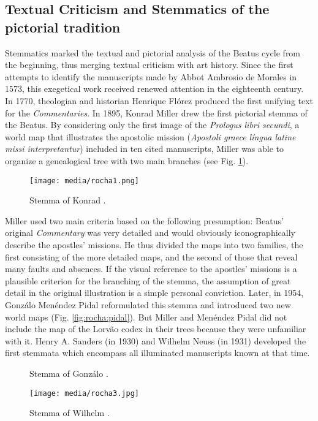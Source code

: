 \begin{paper}
\section*{Textual Criticism and Stemmatics of the pictorial tradition}

Stemmatics marked the textual and pictorial analysis of the Beatus cycle
from the beginning, thus merging textual criticism with art history.
Since the first attempts to identify the manuscripts made by Abbot
Ambrosio de Morales in 1573, this exegetical work received renewed
attention in the eighteenth century. In 1770, theologian and historian
Henrique Flórez produced the first unifying text for the
\emph{Commentaries}. In 1895, Konrad Miller drew the first pictorial stemma of the Beatus. By considering only the first image of the
\emph{Prologus libri secundi}, a world map that illustrates the
apostolic mission (\emph{Apostoli graece língua latine missi
interpretantur}) included in ten cited manuscripts, Miller was able to
organize a genealogical tree with two main branches (see Fig.  \ref{fig:rocha:miller1895}).

\begin{figure}[H]
\centering
\texttt{[image: media/rocha1.png]}
\caption{Stemma of Konrad \citet{miller_mappaemundi_1895}.}
\label{fig:rocha:miller1895}
\end{figure}

Miller used two main criteria based on the following presumption:
Beatus' original \emph{Commentary} was very detailed and would obviously
iconographically describe the apostles' missions. He thus divided the
maps into two families, the first consisting of the more detailed maps,
and the second of those that reveal many faults and absences. If the
visual reference to the apostles' missions is a plausible criterion for
the branching of the stemma, the assumption of great detail in
the original illustration is a simple personal conviction. Later, in
1954, Gonzálo Menéndez Pidal reformulated this stemma and
introduced two new world maps (Fig. \ref{fig:rocha:pidal}). But Miller and Menéndez Pidal
did not include the map of the Lorvão codex in their trees because they
were unfamiliar with it. Henry A. Sanders (in 1930) and Wilhelm Neuss
(in 1931) developed the first stemmata which encompass all
illuminated manuscripts known at that time.


\begin{figure}[H]
    \centering
    \begin{minipage}[b]{0.45\textwidth}
        \caption{Stemma of Gonzálo \citet{menendez_mozarabes_1954}.}
        \label{fig:rocha:pidal}
    \end{minipage}
    \hfill
    \begin{minipage}[b]{0.45\textwidth}
        \texttt{[image: media/rocha3.jpg]}
        \caption{Stemma of Wilhelm \citet{neuss_apokalypse_1931}.}
        \label{fig:rocha:neuss}
    \end{minipage}
\end{figure}


\end{paper}
